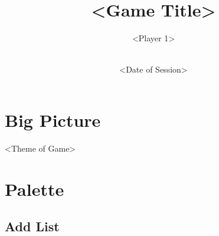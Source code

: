 \documentclass[letterpaper,twoside,openany]{book}
\title{<Game Title>}
\author{<Player 1>\\<Player 2>\\<Player 3>}
\date{<Date of Session>}
\begin{document}
	\frontmatter
	\maketitle

	\tableofcontents

	\chapter{Big Picture}
	\epigraph{<Theme of Game>}{}

	\chapter{Palette}
	\section*{Add List}
\end{document}
